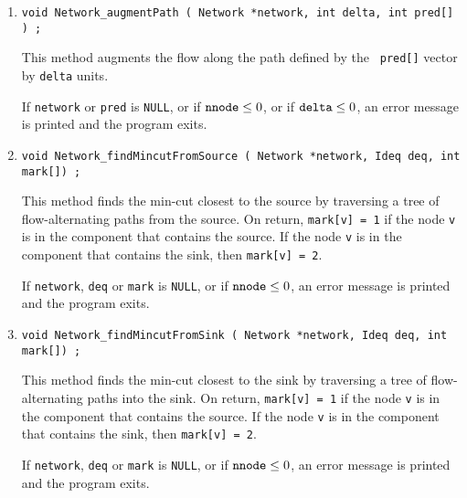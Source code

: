 \begin{enumerate}
\item
\begin{verbatim}
void Network_augmentPath ( Network *network, int delta, int pred[] ) ;
\end{verbatim}
This method augments the flow along the path defined by the {\tt
pred[]} vector by {\tt delta} units.
\par {}
If {\tt network} or {\tt pred} is {\tt NULL},
or if ${\tt nnode} \le 0$,
or if ${\tt delta} \le 0$,
an error message is printed and the program exits.
\item
\begin{verbatim}
void Network_findMincutFromSource ( Network *network, Ideq deq, int mark[]) ;
\end{verbatim}
This method finds the min-cut closest to the source by traversing a
tree of flow-alternating paths from the source.
On return, {\tt mark[v] = 1} if the node {\tt v} is in the
component that contains the source.
If the node {\tt v} is in the component that contains the sink, 
then {\tt mark[v] = 2}.
\par {}
If {\tt network}, {\tt deq} or {\tt mark} is {\tt NULL},
or if ${\tt nnode} \le 0$,
an error message is printed and the program exits.
\item
\begin{verbatim}
void Network_findMincutFromSink ( Network *network, Ideq deq, int mark[]) ;
\end{verbatim}
This method finds the min-cut closest to the sink by traversing a
tree of flow-alternating paths into the sink.
On return, {\tt mark[v] = 1} if the node {\tt v} is in the
component that contains the source.
If the node {\tt v} is in the component that contains the sink, 
then {\tt mark[v] = 2}.
\par {}
If {\tt network}, {\tt deq} or {\tt mark} is {\tt NULL},
or if ${\tt nnode} \le 0$,
an error message is printed and the program exits.
\end{enumerate}
\par
